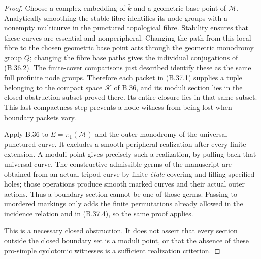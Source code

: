 \documentclass[11pt,oneside]{article}
\begin{document}
\begin{proof}
Choose a complex embedding of $\bar k$ and a geometric
base point of $\mathcal M$. Analytically smoothing the
stable fibre identifies its node groups with a nonempty
multicurve in the punctured topological fibre. Stability
ensures that these curves are essential and
nonperipheral. Changing the path from this local fibre
to the chosen geometric base point acts through the
geometric monodromy group $Q$; changing the fibre base
paths gives the individual conjugations of (B.36.2).
The finite-cover comparisons just described identify
these as the same full profinite node groups. Therefore
each packet in (B.37.1) supplies a tuple belonging to
the compact space $\mathcal K$ of B.36, and its moduli
section lies in the closed obstruction subset proved
there. Its entire closure lies in that same subset.
This last compactness step prevents a node witness
from being lost when boundary packets vary.

Apply B.36 to $E=\pi_1(\mathcal M)$ and the outer
monodromy of the universal punctured curve. It excludes
a smooth peripheral realization after every finite
extension. A moduli point gives precisely such a
realization, by pulling back that universal curve.
The constructive admissible germs of the manuscript
are obtained from an actual tripod curve by finite
\emph{\'etale} covering and filling specified holes;
those operations produce smooth marked curves and
their actual outer actions. Thus a boundary section
cannot be one of those germs. Passing to unordered
markings only adds the finite permutations already
allowed in the incidence relation and in (B.37.4), so
the same proof applies.

This is a necessary closed obstruction. It does not
assert that every section outside the closed boundary
set is a moduli point, or that the absence of these
pro-simple cyclotomic witnesses is a sufficient
realization criterion.
\end{proof}
\end{document}
